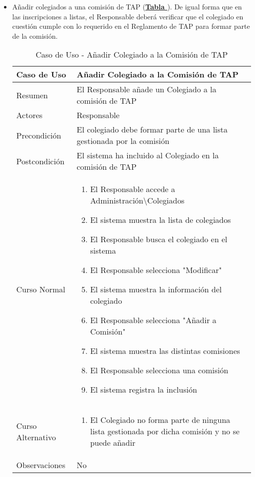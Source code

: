 \begin{itemize}
	\item \addtocounter{tabla}{1} Añadir colegiados a una comisión de TAP (\textbf{\hyperref[tab:curIncluirColegComisionTAP]{Tabla }}). De igual forma que en las inscripciones a listas, el Responsable deberá verificar que el colegiado en cuestión cumple con lo requerido en el Reglamento de TAP\cite{reglamentotapcpiia} para formar parte de la comisión.
		\begin{table}[!htbp]
		  \centering  \addtocounter{casouso}{1}
		  \begin{tabular}{|l | p{100mm}|}
		    \textbf{Caso de Uso}  & \textbf{Añadir Colegiado a la Comisión de TAP} \\ \hline
		    Resumen 		 & El Responsable añade un Colegiado a la comisión de TAP \\ \hline
		    Actores  		 & Responsable \\ \hline
		    Precondición  	 & El colegiado debe formar parte de una lista gestionada por la comisión  \\ \hline
		    Postcondición  	 & El sistema ha incluido al Colegiado en la comisión de TAP \\ \hline
		    Curso Normal   	 & \begin{enumerate}
			  \item El Responsable accede a Administración\textbackslash Colegiados
			  \item El sistema muestra la lista de colegiados
			  \item El Responsable busca el colegiado en el sistema
			  \item El Responsable selecciona "Modificar"
			  \item El sistema muestra la información del colegiado
			  \item El Responsable selecciona "Añadir a Comisión"
			  \item El sistema muestra las distintas comisiones
			  \item El Responsable selecciona una comisión
			  \item El sistema registra la inclusión
		    \end{enumerate}  \\ \hline
		    Curso Alternativo  & \begin{enumerate}
			  \item El Colegiado no forma parte de ninguna lista gestionada por dicha comisión y no se puede añadir
		    \end{enumerate}  \\ \hline
		    Observaciones 	 & No  \\ \hline
		  \end{tabular}
		  \caption{Caso de Uso  - Añadir Colegiado a la Comisión de TAP}
		  \label{tab:curIncluirColegComisionTAP}
		\end{table}
		\FloatBarrier \pagebreak


\end{itemize}
